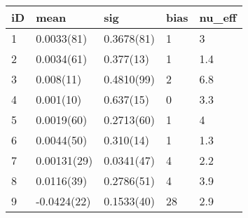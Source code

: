 
\begin{tabular}{l|l|l|l|l}
\hline
iD & mean & sig & bias & nu\_eff\\
\hline
1 & 0.0033(81) & 0.3678(81) & 1 & 3\\
\hline
2 & 0.0034(61) & 0.377(13) & 1 & 1.4\\
\hline
3 & 0.008(11) & 0.4810(99) & 2 & 6.8\\
\hline
4 & 0.001(10) & 0.637(15) & 0 & 3.3\\
\hline
5 & 0.0019(60) & 0.2713(60) & 1 & 4\\
\hline
6 & 0.0044(50) & 0.310(14) & 1 & 1.3\\
\hline
7 & 0.00131(29) & 0.0341(47) & 4 & 2.2\\
\hline
8 & 0.0116(39) & 0.2786(51) & 4 & 3.9\\
\hline
9 & -0.0424(22) & 0.1533(40) & 28 & 2.9\\
\hline
\end{tabular}
